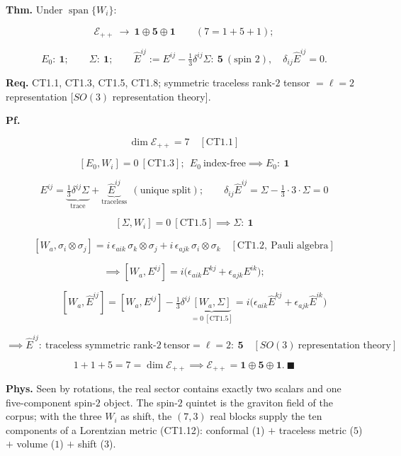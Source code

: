 \begin{theorem}\label{tag:CT1-10}
\textbf{Thm.} Under $\operatorname{span}\{W_i\}$:

\[
\mathcal E_{++}\ \longrightarrow\ \mathbf 1\oplus\mathbf 5\oplus\mathbf 1\qquad(7=1+5+1);
\]

\[
E_0:\ \mathbf 1;\qquad\Sigma:\ \mathbf 1;\qquad
\hat E^{ij}:=E^{ij}-\tfrac13\delta^{ij}\Sigma:\ \mathbf 5\ (\text{spin }2),\quad\delta_{ij}\hat E^{ij}=0 .
\]

\textbf{Req.} CT1.1, CT1.3, CT1.5, CT1.8; symmetric traceless rank-$2$ tensor $=\ell=2$ representation [$SO(3)$ representation theory].

\textbf{Pf.}

\[
\dim\mathcal E_{++}=7\quad[\mathrm{CT1.1}]
\]

\[
[E_0,W_i]=0\ [\mathrm{CT1.3}];\ \ E_0\ \text{index-free}\implies E_0:\ \mathbf 1
\]

\[
E^{ij}=\underbrace{\tfrac13\delta^{ij}\Sigma}_{\text{trace}}+\underbrace{\hat E^{ij}}_{\text{traceless}}\ \ (\text{unique split});\qquad
\delta_{ij}\hat E^{ij}=\Sigma-\tfrac13\cdot3\cdot\Sigma=0
\]

\[
[\Sigma,W_i]=0\ [\mathrm{CT1.5}]\implies\Sigma:\ \mathbf 1
\]

\[
[W_a,\sigma_i\otimes\sigma_j]=i\,\epsilon_{aik}\,\sigma_k\otimes\sigma_j+i\,\epsilon_{ajk}\,\sigma_i\otimes\sigma_k\quad[\mathrm{CT1.2},\ \text{Pauli algebra}]
\]

\[
\implies[W_a,E^{ij}]=i\bigl(\epsilon_{aik}E^{kj}+\epsilon_{ajk}E^{ik}\bigr);
\]

\[
\qquad [W_a,\hat E^{ij}]=[W_a,E^{ij}]-\tfrac13\delta^{ij}\underbrace{[W_a,\Sigma]}_{=0\ [\mathrm{CT1.5}]}=i\bigl(\epsilon_{aik}\hat E^{kj}+\epsilon_{ajk}\hat E^{ik}\bigr)
\]

\[
\implies\hat E^{ij}:\ \text{traceless symmetric rank-}2\ \text{tensor}=\ell=2:\ \mathbf 5\quad[SO(3)\ \text{representation theory}]
\]

\[
1+1+5=7=\dim\mathcal E_{++}\implies\mathcal E_{++}=\mathbf 1\oplus\mathbf 5\oplus\mathbf 1.\ \blacksquare
\]

\textbf{Phys.} Seen by rotations, the real sector contains exactly two scalars and one five-component spin-$2$ object. The spin-$2$ quintet is the graviton field of the corpus; with the three $W_i$ as shift, the $(7,3)$ real blocks supply the ten components of a Lorentzian metric (CT1.12): conformal ($1$) $+$ traceless metric ($5$) $+$ volume ($1$) $+$ shift ($3$).

\end{theorem}

